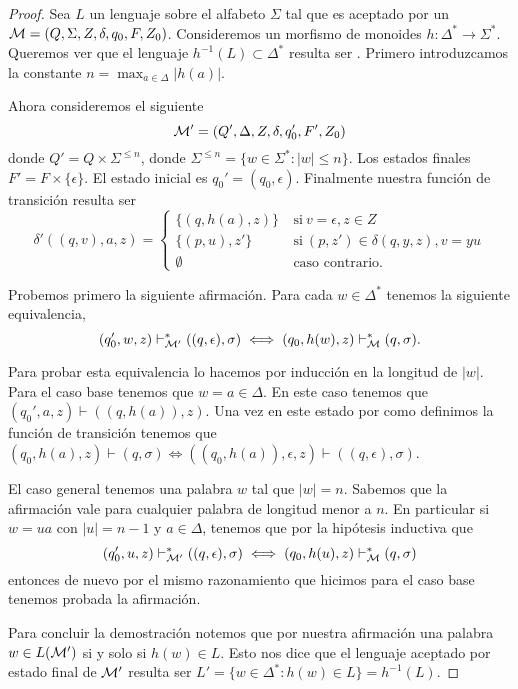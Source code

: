 \documentclass[tesis.tex]{subfiles}
\begin{document}
\begin{proof}
	Sea $L$ un lenguaje \ic sobre el alfabeto $\Sigma$ tal que es aceptado por un \APND ${\cal M } = (Q, \Sigma, Z, \delta, q_0, F, Z_0)$.
	Consideremos un morfismo de monoides $h: \Delta^* \to \Sigma^*$. 
	Queremos ver que el lenguaje $h^{-1}(L) \subset \Delta^*$ resulta ser \ic. 
	Primero introduzcamos la constante $ n = \max_{a \in \Delta} |h(a)|$.
	
	Ahora consideremos el siguiente \APND 
	\[
	{\cal M' } = (Q', \Delta, Z, \delta, q_0', F', Z_0)
	\]
	donde $Q' = Q \times \Sigma^{\le n}$, donde $\Sigma^{\le n} = \{ w \in \Sigma^* : |w| \le n  \}$.
	Los estados finales $F' = F \times \{ \epsilon \}$.
	El estado inicial es $q_0' = (q_0, \epsilon)$.
	Finalmente nuestra función de transición resulta ser 
	\[
	\delta'((q,v), a ,z) = 
	\begin{cases}
		\{(q,h(a), z )\}  \ &\text{si} \ v=\epsilon, z \in Z \\
		\{(p,u),z' \} \ &\text{si} \ (p,z') \in \delta(q,y,z), v=yu \\  
		\emptyset \ &\text{caso contrario}.
	\end{cases}
	\]
	
	Probemos primero la siguiente afirmación.
	Para cada $w \in \Delta^*$ tenemos la siguiente equivalencia,
	\[
	(q_0',w,z) \vdash^*_{\cal M'} ((q,\epsilon), \sigma) \iff (q_0,h(w), z) \vdash^*_{\cal M} (q, \sigma).
	\]
	
	Para probar esta equivalencia lo hacemos por inducción en la longitud de $|w|$.
	Para el caso base tenemos que $w = a \in \Delta$.
	En este caso tenemos que $(q_0', a, z) \vdash ((q,h(a)), z)$.
	Una vez en este estado por como definimos la función de transición tenemos que $ (q_0,h(a), z) \vdash (q, \sigma)  \iff ((q_0,h(a)), \epsilon ,z) \vdash ((q,\epsilon), \sigma)$.
	
	El caso general tenemos una palabra $w$ tal que $|w|=n$.
	Sabemos que la afirmación vale para cualquier palabra de longitud menor a $n$.
	En particular si $w=ua$ con $|u|=n-1$ y $a \in \Delta$, tenemos que por la hipótesis inductiva que 
	\[
	(q_0',u,z) \vdash^*_{\cal M'} ((q,\epsilon), \sigma) \iff (q_0,h(u), z) \vdash^*_{\cal M} (q, \sigma)
	\]
	entonces de nuevo por el mismo razonamiento que hicimos para el caso base tenemos probada la afirmación.
	
	Para concluir la demostración notemos que por nuestra afirmación una palabra $w \in L(\cal M')$ si y solo si $h(w) \in L$. 
	Esto nos dice que el lenguaje aceptado por estado final de $\cal M'$ resulta ser $L' = \{ w \in \Delta^* : h(w) \in L \} = h^{-1}(L)$.
\end{proof}
\end{document}
